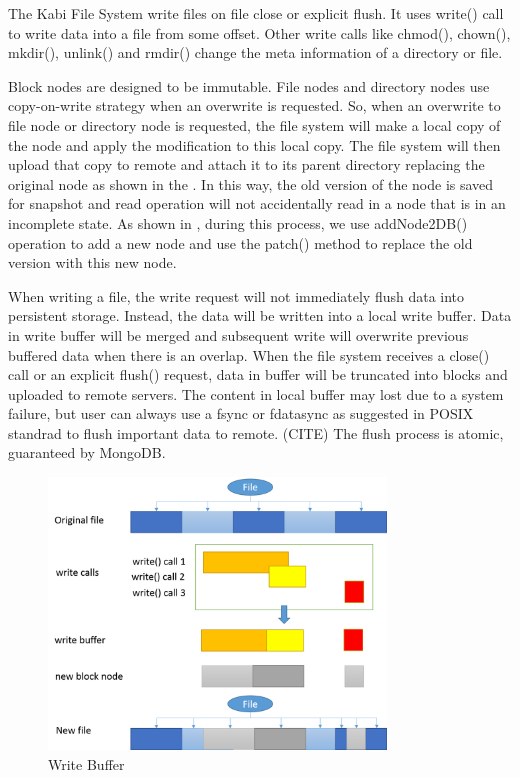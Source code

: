     The Kabi File System write files on file close or explicit flush. It uses write() call to write data into a file from some offset. Other write calls like chmod(), chown(), mkdir(), unlink() and rmdir() change the meta information of a directory or file.

    Block nodes are designed to be immutable. File nodes and directory nodes use copy-on-write strategy when an overwrite is requested. So, when an overwrite to file node or directory node is requested, the file system will make a local copy of the node and apply the modification to this local copy. The file system will then upload that copy to remote and attach it to its parent directory replacing the original node as shown in the . In this way, the old version of the node is saved for snapshot and read operation will not accidentally read in a node that is in an incomplete state. As shown in , during this process, we use addNode2DB() operation to add a new node and use the patch() method to replace the old version with this new node.

	When writing a file, the write request will not immediately flush data into persistent storage. Instead, the data will be written into a local write buffer. Data in write buffer will be merged and subsequent write will overwrite previous buffered data when there is an overlap. When the file system receives a close() call or an explicit flush() request, data in buffer will be truncated into blocks and uploaded to remote servers. The content in local buffer may lost due to a system failure, but user can always use a fsync or fdatasync as suggested in POSIX standrad to flush important data to remote. (CITE) The flush process is atomic, guaranteed by MongoDB. 

\begin{figure}[hbtp]
\centering
\includegraphics[width=0.8\textwidth]{Chapter-3/figs/fig11.png}
\caption{Write Buffer}
\label{fig:buffer}
\end{figure}

